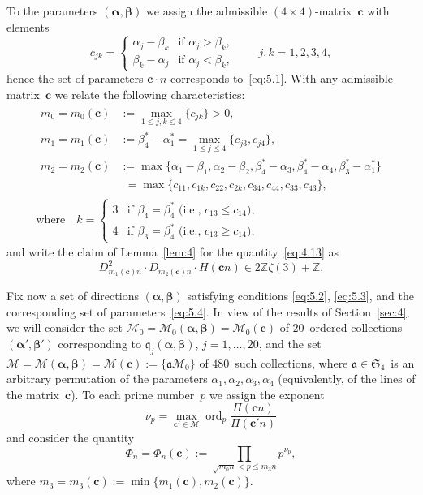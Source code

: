 \documentclass[a4paper,twoside]{article}
\numberwithin{equation}{section}
\renewcommand{\[}{\lfloor}
\renewcommand{\]}{\rfloor}
\newcommand{\<}{\langle}
\renewcommand{\>}{\rangle}
\DeclareMathOperator{\ord}{ord}
\newcommand{\bc}{\boldsymbol c}
\newcommand{\balpha}{\boldsymbol\alpha}
\newcommand{\bbeta}{\boldsymbol\beta}
\newcommand{\fa}{\mathfrak a}
\newcommand{\fq}{\mathfrak q}
\newcommand{\fS}{\mathfrak S}
\newcommand{\sM}{\mathcal M}
\begin{document}
To the parameters $(\balpha,\bbeta)$ we assign the admissible
$(4\times4)$-matrix~$\bc$ with elements
\begin{equation}
c_{jk}=\begin{cases}
\alpha_j-\beta_k & \mbox{if $\alpha_j>\beta_k$}, \\
\beta_k-\alpha_j & \mbox{if $\alpha_j<\beta_k$},
\end{cases}
\qquad j,k=1,2,3,4,
\label{eq:5.4}
\end{equation}
hence the set of parameters $\bc\cdot n$ corresponds to~\eqref{eq:5.1}.
With any admissible matrix~$\bc$ we relate the following characteristics:
$$
\begin{gathered}
\begin{aligned}
m_0=m_0(\bc)
&:=\max_{1\le j,k\le4}\{c_{jk}\}>0,
\\
m_1=m_1(\bc)
&:=\beta_4^*-\alpha_1^*=\max_{1\le j\le4}\{c_{j3},c_{j4}\},
\\
m_2=m_2(\bc)
&:=\max\{\alpha_1-\beta_1,\alpha_2-\beta_2,
\beta_4^*-\alpha_3,\beta_4^*-\alpha_4,\beta_3^*-\alpha_1^*\}
\\ &\phantom:
=\max\{c_{11},c_{1k},c_{22},c_{2k},c_{34},c_{44},c_{33},c_{43}\},
\end{aligned}
\\
\mbox{where}\quad
k=\begin{cases}
3 &\mbox{if $\beta_4=\beta_4^*$ (i.e., $c_{13}\le c_{14}$)}, \\
4 &\mbox{if $\beta_3=\beta_4^*$ (i.e., $c_{13}\ge c_{14}$)},
\end{cases}
\end{gathered}
$$
and write the claim of Lemma~\ref{lem:4}
for the quantity~\eqref{eq:4.13} as
\begin{equation}
D_{m_1(\bc)n}^2\cdot D_{m_2(\bc)n}\cdot H(\bc n)
\in2\mathbb Z\zeta(3)+\mathbb Z.
\label{eq:5.5}
\end{equation}

Fix now a set of directions $(\balpha,\bbeta)$
satisfying conditions \eqref{eq:5.2}, \eqref{eq:5.3}, and the
corresponding set of parameters~\eqref{eq:5.4}. In view of the results
of Section~\ref{sec:4}, we will consider the set
$\sM_0=\sM_0(\balpha,\bbeta)=\sM_0(\bc)$
of $20$~ordered collections $(\balpha',\bbeta')$
corresponding to $\fq_j(\balpha,\bbeta)$, $j=1,\dots,20$,
and the set $\sM=\sM(\balpha,\bbeta)=\sM(\bc):=\{\fa\sM_0\}$
of $480$~such collections, where $\fa\in\fS_4$~is an arbitrary
permutation of the parameters
$\alpha_1,\alpha_2,\alpha_3,\alpha_4$
(equivalently, of the lines of the matrix~$\bc$).
To each prime number~$p$ we assign the exponent
$$
\nu_p=\max_{\bc'\in\sM}
\ord_p\frac{\varPi(\bc n)}{\varPi(\bc'n)}
$$
and consider the quantity
\begin{equation}
\Phi_n=\Phi_n(\bc):=\prod_{\sqrt{m_0n}<p\le m_3n}p^{\nu_p},
\label{eq:5.6}
\end{equation}
where $m_3=m_3(\bc):=\min\{m_1(\bc),m_2(\bc)\}$.
\end{document}
